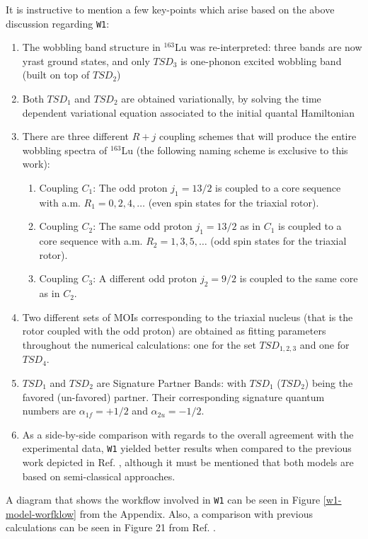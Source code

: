 \documentclass[myclassdoc,debug]{rjparticle}
\begin{document}
It is instructive to mention a few key-points which arise based on the above discussion regarding \texttt{W1}:

\begin{enumerate}
    \item The wobbling band structure in $^{163}$Lu was re-interpreted: three bands are now yrast ground states, and only $TSD_3$ is one-phonon excited wobbling band (built on top of $TSD_2$)
    \item Both $TSD_1$ and $TSD_2$ are obtained variationally, by solving the time dependent variational equation associated to the initial quantal Hamiltonian
    \item There are three different $R+j$ coupling schemes that will produce the entire wobbling spectra of $^{163}$Lu (the following naming scheme is exclusive to this work):
    \begin{enumerate}
        \item Coupling $C_1$: The odd proton $j_1={13/2}$ is coupled to a core sequence with a.m. $R_1=0,2,4,\dots$ (even spin states for the triaxial rotor).
        \item Coupling $C_2$: The same odd proton $j_1={13/2}$ as in $C_1$ is coupled to a core sequence with a.m. $R_2=1,3,5,\dots$ (odd spin states for the triaxial rotor).
        \item Coupling $C_3$: A different odd proton $j_2={9/2}$ is coupled to the same core as in $C_2$.
    \end{enumerate}
    \item Two different sets of MOIs corresponding to the triaxial nucleus (that is the rotor coupled with the odd proton) are obtained as fitting parameters throughout the numerical calculations: one for the set $TSD_{1,2,3}$ and one for $TSD_4$.
    \item $TSD_1$ and $TSD_2$ are Signature Partner Bands: with $TSD_1$ ($TSD_2$) being the favored (un-favored) partner. Their corresponding signature quantum numbers are $\alpha_{1f}=+1/2$ and $\alpha_{2u}=-1/2$.
    \item As a side-by-side comparison with regards to the overall agreement with the experimental data, \texttt{W1} yielded better results when compared to the previous work depicted in Ref. \cite{raduta2007semiclassical}, although it must be mentioned that both models are based on semi-classical approaches.
\end{enumerate}

A diagram that shows the workflow involved in \texttt{W1} can be seen in Figure \ref{w1-model-worfklow} from the Appendix. Also, a comparison with previous calculations can be seen in Figure 21 from Ref. \cite{raduta2020approach}.
\end{document}
